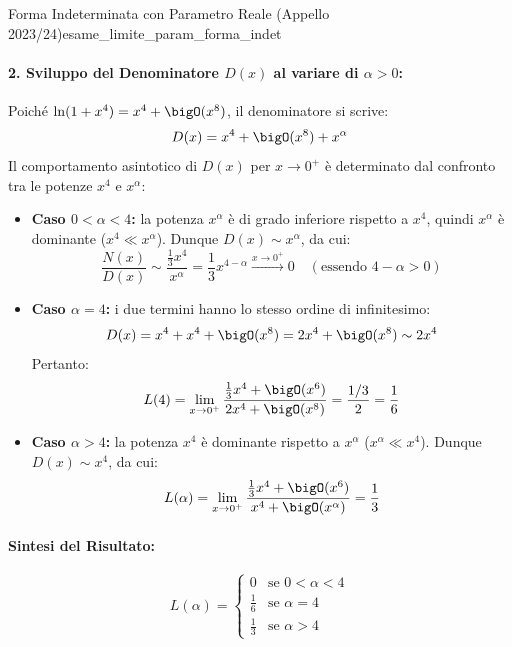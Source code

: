 \begin{esempio}{Forma Indeterminata con Parametro Reale (Appello 2023/24)}{esame_limite_param_forma_indet}
\paragraph{2. Sviluppo del Denominatore $D(x)$ al variare di $\alpha > 0$:}
Poiché $\ln(1 + x^4) = x^4 + \bigO(x^8)$, il denominatore si scrive:
\[
    D(x) = x^4 + \bigO(x^8) + x^\alpha
\]
Il comportamento asintotico di $D(x)$ per $x \to 0^+$ è determinato dal confronto tra le potenze $x^4$ e $x^\alpha$:
\begin{itemize}
    \item \textbf{Caso $0 < \alpha < 4$:} la potenza $x^\alpha$ è di grado inferiore rispetto a $x^4$, quindi $x^\alpha$ è dominante ($x^4 \ll x^\alpha$).
    Dunque $D(x) \sim x^\alpha$, da cui:
    \[
        \frac{N(x)}{D(x)} \sim \frac{\frac{1}{3}x^4}{x^\alpha} = \frac{1}{3}x^{4 - \alpha} \xrightarrow{x \to 0^+} 0 \quad (\text{essendo } 4 - \alpha > 0)
    \]
    \item \textbf{Caso $\alpha = 4$:} i due termini hanno lo stesso ordine di infinitesimo:
    \[
        D(x) = x^4 + x^4 + \bigO(x^8) = 2x^4 + \bigO(x^8) \sim 2x^4
    \]
    Pertanto:
    \[
        L(4) = \lim_{x \to 0^+} \frac{\frac{1}{3}x^4 + \bigO(x^6)}{2x^4 + \bigO(x^8)} = \frac{1/3}{2} = \frac{1}{6}
    \]
    \item \textbf{Caso $\alpha > 4$:} la potenza $x^4$ è dominante rispetto a $x^\alpha$ ($x^\alpha \ll x^4$).
    Dunque $D(x) \sim x^4$, da cui:
    \[
        L(\alpha) = \lim_{x \to 0^+} \frac{\frac{1}{3}x^4 + \bigO(x^6)}{x^4 + \bigO(x^\alpha)} = \frac{1}{3}
    \]
\end{itemize}
\paragraph{Sintesi del Risultato:}
\[
    L(\alpha) = \begin{cases}
        0 & \text{se } 0 < \alpha < 4 \\
        \frac{1}{6} & \text{se } \alpha = 4 \\
        \frac{1}{3} & \text{se } \alpha > 4
    \end{cases}
\]
\end{esempio}
